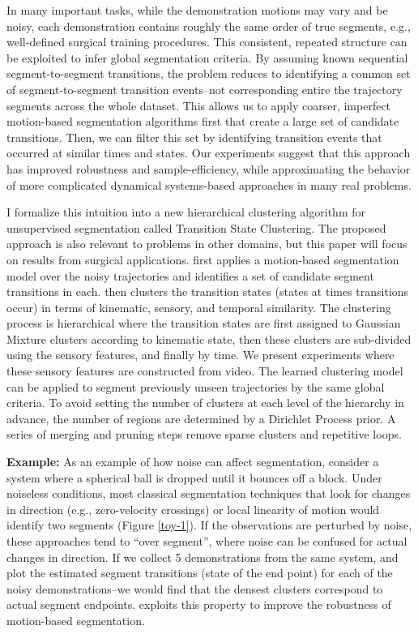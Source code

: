 In many important tasks, while the demonstration motions may vary and be noisy, each demonstration contains roughly the same order of true segments, e.g., well-defined surgical training procedures.
This consistent, repeated structure can be exploited to infer global segmentation criteria.
By assuming known sequential segment-to-segment transitions, the problem reduces to identifying a common set of segment-to-segment transition events--not corresponding entire the trajectory segments across the whole dataset.
This allows us to apply coarser, imperfect motion-based segmentation algorithms first that create a large set of candidate transitions.
Then, we can filter this set by identifying transition events that occurred at similar times and states.
Our experiments suggest that this approach has improved robustness and sample-efficiency, while approximating the behavior of more complicated dynamical systems-based approaches in many real problems.

I formalize this intuition into a new hierarchical clustering algorithm for unsupervised segmentation called Transition State Clustering.
The proposed approach is also relevant to problems in other domains, but this paper will focus on results from surgical applications.
\tsc first applies a motion-based segmentation model over the noisy trajectories and identifies a set of candidate segment transitions in each.
\tsc then clusters the transition states (states at times transitions occur) in terms of kinematic, sensory, and temporal similarity. 
The clustering process is hierarchical where the transition states are first assigned to Gaussian Mixture clusters according to kinematic state, then these clusters are sub-divided using the sensory features, and finally by time.
We present experiments where these sensory features are constructed from video.
The learned clustering model can be applied to segment previously unseen trajectories by the same global criteria.
To avoid setting the number of clusters at each level of the hierarchy in advance, the number of regions are determined by a Dirichlet Process prior.
A series of merging and pruning steps remove sparse clusters and repetitive loops.


\vspace{0.5em}

\noindent \textbf{Example: } As an example of how noise can affect segmentation, consider a system where a spherical ball is dropped until it bounces off a block.
Under noiseless conditions, most classical segmentation techniques that look for changes in direction (e.g., zero-velocity crossings) or local linearity of motion would identify two segments (Figure \ref{toy-1}).
If the observations are perturbed by noise, these approaches tend to ``over segment'', where noise can be confused for actual changes in direction.
If we collect 5 demonstrations from the same system, and
plot the estimated segment transitions (state of the end point) for each of the noisy demonstrations--we would find that the densest clusters correspond to actual segment endpoints.
\tsc exploits this property to improve the robustness of motion-based segmentation.


